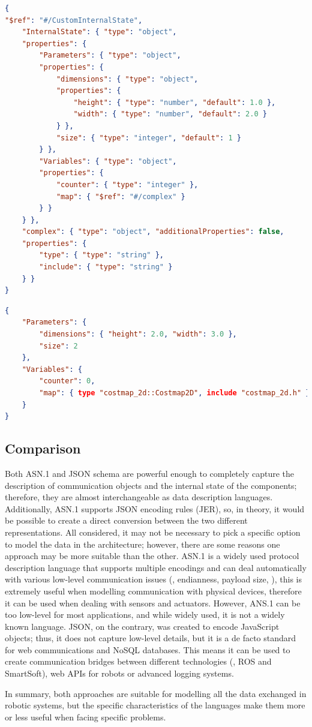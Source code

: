 \begin{lstlisting}[language=JSON, caption={Internal state defined using JSON schema},label=lst:json-is]
{
"$ref": "#/CustomInternalState",
	"InternalState": { "type": "object",
	"properties": {
		"Parameters": { "type": "object",
		"properties": {
			"dimensions": { "type": "object",
			"properties": {
				"height": { "type": "number", "default": 1.0 },
				"width": { "type": "number", "default": 2.0 }
			} },
			"size": { "type": "integer", "default": 1 }
		} },
		"Variables": { "type": "object",
		"properties": {
			"counter": { "type": "integer" },
			"map": { "$ref": "#/complex" }
		} }
	} },
	"complex": { "type": "object", "additionalProperties": false,
	"properties": {
		"type": { "type": "string" },
		"include": { "type": "string" }
	} }
}
\end{lstlisting}

\begin{lstlisting}[language=JSON, caption={Internal state instance defined in JSON},label=lst:json-inst]
{
	"Parameters": {
		"dimensions": { "height": 2.0, "width": 3.0 },
		"size": 2
	},
	"Variables": {
		"counter": 0,
		"map": { type "costmap_2d::Costmap2D", include "costmap_2d.h" }
	}
}
\end{lstlisting}

\subsection{Comparison}
Both ASN.1 and JSON schema are powerful enough to completely capture the description of communication objects and the internal state of the components; therefore, they are almost interchangeable as data description languages. Additionally, ASN.1 supports JSON encoding rules (JER), so, in theory, it would be possible to create a direct conversion between the two different representations. All considered, it may not be necessary to pick a specific option to model the data in the architecture; however, there are some reasons one approach may be more suitable than the other. ASN.1 is a widely used protocol description language that supports multiple encodings and can deal automatically with various low-level communication issues (\eg, endianness, payload size, \etc), this is extremely useful when modelling communication with physical devices, therefore it can be used when dealing with sensors and actuators. However, ANS.1 can be too low-level for most applications, and while widely used, it is not a widely known language. JSON, on the contrary, was created to encode JavaScript objects; thus, it does not capture low-level details, but it is a de facto standard for web communications and NoSQL databases. This means it can be used to create communication bridges between different technologies (\eg, ROS and SmartSoft), web APIs for robots or advanced logging systems.

In summary, both approaches are suitable for modelling all the data exchanged in robotic systems, but the specific characteristics of the languages make them more or less useful when facing specific problems. 
